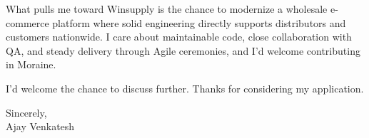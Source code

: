 \documentclass[letterpaper,11pt]{article}
\begin{document}
What pulls me toward Winsupply is the chance to modernize a wholesale e-commerce platform where solid engineering directly supports distributors and customers nationwide. I care about maintainable code, close collaboration with QA, and steady delivery through Agile ceremonies, and I'd welcome contributing in Moraine.

I'd welcome the chance to discuss further. Thanks for considering my application.

\vspace{12pt}
Sincerely, \\
Ajay Venkatesh
\end{document}
